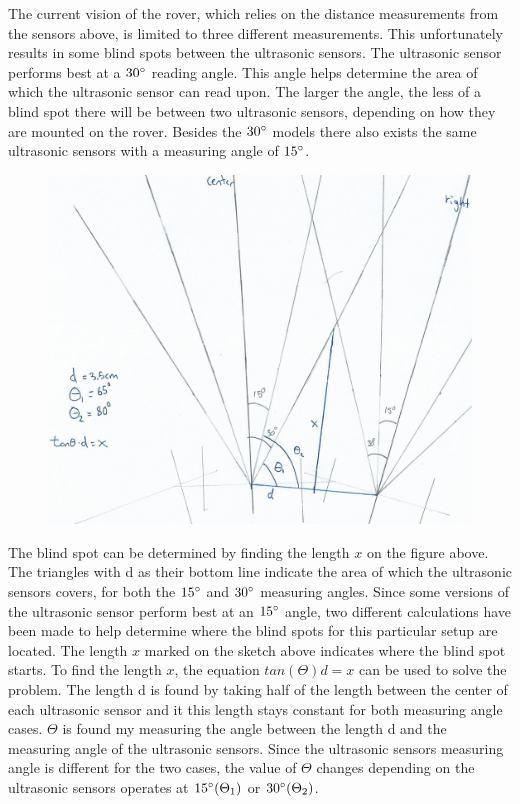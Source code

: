
The current vision of the rover, which relies on the distance measurements from the sensors above, is limited to three different measurements. This unfortunately results in some blind spots between the ultrasonic sensors.
The ultrasonic sensor performs best at a $30\degree$ reading angle. This angle helps determine the area of which the ultrasonic sensor can read upon. The larger the angle, the less of a blind spot there will be between two ultrasonic sensors, depending on how they are mounted on the rover\cite{hcsr40datesheet}. Besides the $30\degree$ models there also exists the same ultrasonic sensors with a measuring angle of $15\degree$.

\clearpage
\begin{figure}[H]
	\centering
	\includegraphics[width=0.8\linewidth]{images/blindspot_calc.jpg}
\end{figure}

The blind spot can be determined by finding the length $x$ on the figure above. The triangles with d as their bottom line indicate the area of which the ultrasonic sensors covers, for both the $15\degree$ and $30\degree$ measuring angles. Since some versions of the ultrasonic sensor perform best at an $15\degree$ angle, two different calculations have been made to help determine where the blind spots for this particular setup are located.
The length $x$ marked on the sketch above indicates where the blind spot starts. To find the length $x$, the equation $tan(\Theta)d = x$ can be used to solve the problem. The length d is found by taking half of the length between the center of each ultrasonic sensor and it this length stays constant for both measuring angle cases. $\Theta$ is found my measuring the angle between the length d and the measuring angle of the ultrasonic sensors. Since the ultrasonic sensors measuring angle is different for the two cases, the value of $\Theta$ changes depending on the ultrasonic sensors operates at $15\degree (\Theta_1)$ or $30\degree (\Theta_2)$.

